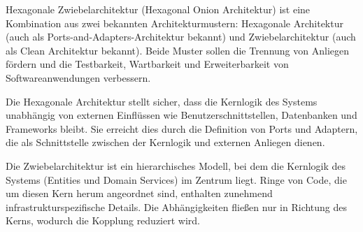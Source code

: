 Hexagonale Zwiebelarchitektur (Hexagonal Onion Architektur) ist eine Kombination aus zwei bekannten Architekturmustern: Hexagonale Architektur (auch als Ports-and-Adapters-Architektur bekannt) und Zwiebelarchitektur (auch als Clean Architektur bekannt). Beide Muster sollen die Trennung von Anliegen fördern und die Testbarkeit, Wartbarkeit und Erweiterbarkeit von Softwareanwendungen verbessern.

Die Hexagonale Architektur stellt sicher, dass die Kernlogik des Systems unabhängig von externen Einflüssen wie Benutzerschnittstellen, Datenbanken und Frameworks bleibt. Sie erreicht dies durch die Definition von Ports und Adaptern, die als Schnittstelle zwischen der Kernlogik und externen Anliegen dienen.

Die Zwiebelarchitektur ist ein hierarchisches Modell, bei dem die Kernlogik des Systems (Entities und Domain Services) im Zentrum liegt. Ringe von Code, die um diesen Kern herum angeordnet sind, enthalten zunehmend infrastrukturspezifische Details. Die Abhängigkeiten fließen nur in Richtung des Kerns, wodurch die Kopplung reduziert wird.

